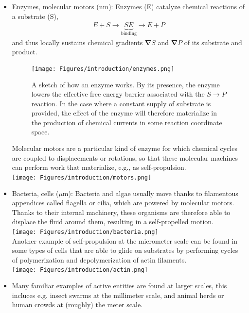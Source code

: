 \begin{itemize}
    \item Enzymes, molecular motors (nm): Enzymes (E) catalyze chemical reactions of a substrate (S),
    \begin{align}
        E + S \longrightarrow  \underbrace{SE}_{\mathrm{binding}} \longrightarrow  E + P
    \end{align}
     and thus locally sustains chemical gradients $\bm \nabla S$ and $\bm \nabla P$ of its substrate and product. 
     \begin{figure}[H]
        \centering
        \texttt{[image: Figures/introduction/enzymes.png]}
        \caption{A sketch of how an enzyme works. By its presence, the enzyme lowers the effective free energy barrier associated with the $S \to P$ reaction. In the case where a constant supply of substrate is provided, the effect of the enzyme will therefore materialize in the production of chemical currents in some reaction coordinate space.}
        \label{fig: enzymes}
    \end{figure}
     Molecular motors are a particular kind of enzyme for which chemical cycles are coupled to displacements or rotations, so that these molecular machines can perform work that materialize, e.g., as self-propulsion.\\
     \texttt{[image: Figures/introduction/motors.png]}
    \item Bacteria, cells ($\mu$m): Bacteria and algae usually move thanks to filamentous appendices called flagella or cilia, which are powered by molecular motors.
    Thanks to their internal machinery, these organisms are therefore able to displace the fluid around them, resulting in a self-propelled motion.
    \\
    \texttt{[image: Figures/introduction/bacteria.png]} 
    \\
    Another example of self-propulsion at the micrometer scale can be found in some types of cells that are able to glide on substrates by performing cycles of polymerization and depolymerization of actin filaments.
    \\
    \texttt{[image: Figures/introduction/actin.png]}
     
    \item Many familiar examples of active entities are found at larger scales, this incluces e.g.  insect swarms at the millimeter scale, and animal herds or human crowds at (roughly) the meter scale.
\end{itemize}


